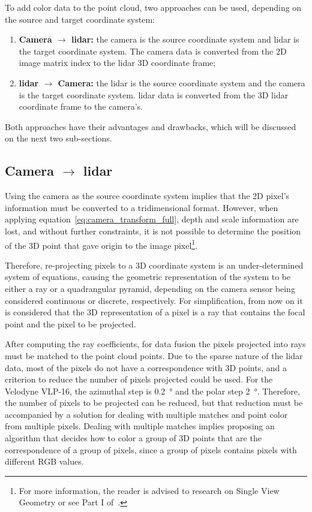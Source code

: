 To add color data to the point cloud, two approaches can be used, depending on the source and target coordinate system:

\begin{enumerate} 
	\item \textbf{Camera $\rightarrow$ \ac{lidar}:} the camera is the source coordinate system and \ac{lidar} is the target coordinate system. The camera data is converted from the 2D image  matrix index to the \ac{lidar} 3D coordinate frame;
	\item \textbf{\ac{lidar} $\rightarrow$ Camera:} the \ac{lidar} is the source coordinate system and the camera is the target coordinate system. \ac{lidar} data is converted from the 3D \ac{lidar} coordinate frame to the camera's.
\end{enumerate}

Both approaches have their advantages and drawbacks, which will be discussed on the next two sub-sections.

\subsection{Camera $\rightarrow$ \ac{lidar}} 
Using the camera as the source coordinate system implies that the 2D pixel's information must be converted to a tridimensional format. However, when applying equation~\ref{eq:camera_transform_full}, depth and scale information are lost, and without further constraints, it is not possible to determine the position of the 3D point that gave origin to the image pixel\footnote{For more information, the reader is advised to research on Single View Geometry or see Part I of~\cite{mvg_book}.}. 

Therefore, re-projecting pixels to a 3D coordinate system is an under-determined system of equations, causing the geometric representation of the system to be either a ray or a quadrangular pyramid, depending on the camera sensor being considered continuous or discrete, respectively. For simplification, from now on it is considered that the 3D representation of a pixel is a ray that contains the focal point and the pixel to be projected.

After computing the ray coefficients, for data fusion the pixels projected into rays must be matched to the point cloud points. Due to the sparse nature of the \ac{lidar} data, most of the pixels do not have a correspondence with 3D points, and a criterion to reduce the number of pixels projected could be used. For the Velodyne VLP-16, the azimuthal step is \SI{0.2}{\degree} and the polar step \SI{2}{\degree}. Therefore, the number of pixels to be projected can be reduced, but that reduction must be accompanied by a solution for dealing with multiple matches and point color from multiple pixels. Dealing with multiple matches implies proposing an algorithm that decides  how to color a group of 3D points that are the correspondence of a group of pixels, since a group of pixels contains pixels with different RGB values.

